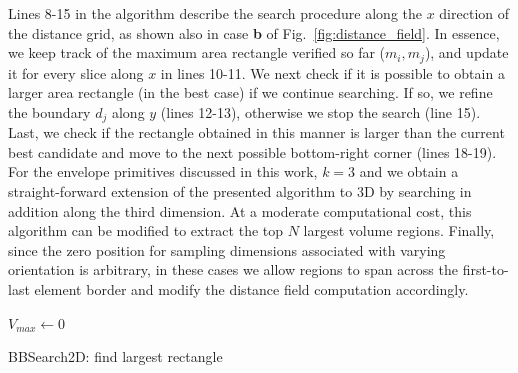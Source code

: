Lines 8-15 in the algorithm describe the search procedure along the $x$ direction of the distance grid, as shown also in case \textbf{b} of Fig.~\ref{fig:distance_field}.
In essence, we keep track of the maximum area rectangle verified so far ($m_i,m_j$), and update it for every slice along $x$ in lines 10-11. 
We next check if it is possible to obtain a larger area rectangle (in the best case) if we continue searching.
If so, we refine the boundary $d_j$ along $y$ (lines 12-13), otherwise we stop the search (line 15).
Last, we check if the rectangle obtained in this manner is larger than the current best candidate and move to the next possible bottom-right corner (lines 18-19).
For the envelope primitives discussed in this work, $k=3$ and we obtain a straight-forward extension of the presented algorithm to 3D by searching in addition along the third dimension.
At a moderate computational cost, this algorithm can be modified to extract the top $N$ largest volume regions. 
Finally, since the zero position for sampling dimensions associated with varying orientation is arbitrary, in these cases we allow regions to span across the first-to-last element border and modify the distance field computation accordingly.
\begin{algorithm}[t!]
\DontPrintSemicolon %
$V_{max} \gets 0$\;
\;
\caption{{\sc BBSearch2D:} find largest rectangle}
\label{alg:bbsearch}
\end{algorithm}
